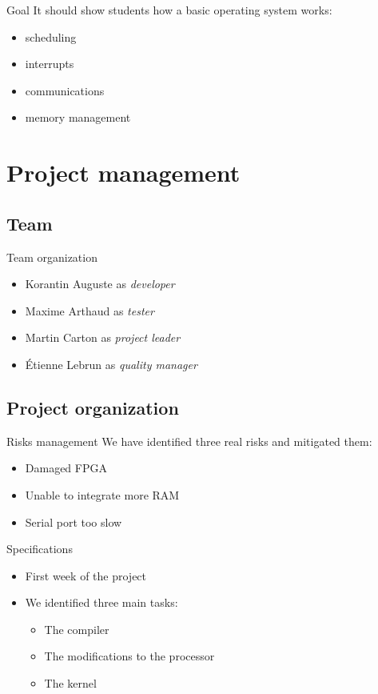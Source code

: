 \documentclass{beamer}
\begin{document}
    \begin{frame}{Goal}
      It should show students how a basic operating system works:
        \begin{itemize}
          \item scheduling
          \item interrupts
          \item communications
          \item memory management
        \end{itemize}
    \end{frame}

  \section{Project management}
    \subsection{Team}
      \begin{frame}{Team organization}
        \begin{itemize}
          \item Korantin Auguste as \textit{developer}
          \item Maxime Arthaud as \textit{tester}
          \item Martin Carton as \textit{project leader}
          \item Étienne Lebrun as \textit{quality manager}
        \end{itemize}
      \end{frame}

    \subsection{Project organization}
      \begin{frame}{Risks management}
        We have identified three real risks and mitigated them:
        \begin{itemize}
          \item Damaged FPGA
          \item Unable to integrate more RAM
          \item Serial port too slow
        \end{itemize}
      \end{frame}

      \begin{frame}{Specifications}
        \begin{itemize}
          \item First week of the project
          \item We identified three main tasks:
            \begin{itemize}
              \item The compiler
              \item The modifications to the processor
              \item The kernel
            \end{itemize}
          \end{itemize}
      \end{frame}
\end{document}
